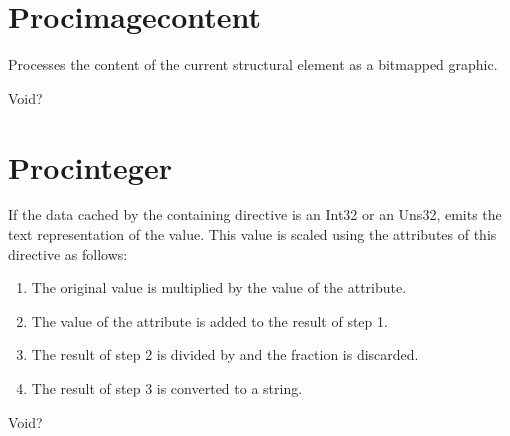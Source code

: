 \documentclass[letterpaper,12pt,english,openany,oneside]{sphinxmanual}
\begin{document}
\section{Proc\sphinxhyphen{}image\sphinxhyphen{}content}
\label{\detokenize{SaveAsXML_DirectivesRef:proc-image-content}}
Processes the content of the current structural element as a bitmapped graphic.

\label{\detokenize{SaveAsXML_DirectivesRef:dtd-content-rule-19}}

\begin{sphinxVerbatim}[commandchars=\\\{\}]
Void?
\end{sphinxVerbatim}


\section{Proc\sphinxhyphen{}integer}
\label{\detokenize{SaveAsXML_DirectivesRef:proc-integer}}
If the data cached by the containing  directive is an Int32 or an Uns32, emits the text representation of the value. This value is scaled using the attributes of this directive as follows:
\begin{enumerate}
%
\item {} 
The original value is multiplied by the value of the  attribute.

\item {} 
The value of the  attribute is added to the result of step 1.

\item {} 
The result of step 2 is divided by  and the fraction is discarded.

\item {} 
The result of step 3 is converted to a string.

\end{enumerate}
\label{\detokenize{SaveAsXML_DirectivesRef:dtd-content-rule-20}}

\begin{sphinxVerbatim}[commandchars=\\\{\}]
Void?
\end{sphinxVerbatim}
\label{\detokenize{SaveAsXML_DirectivesRef:attributes-16}}
\end{document}
